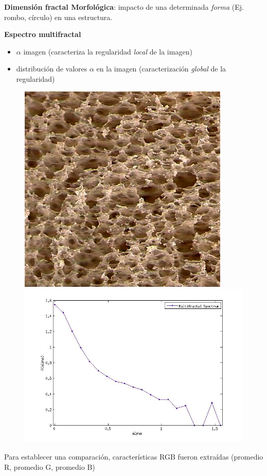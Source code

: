\documentclass{beamer}
\begin{document}
\begin{frame}
\textbf{Dimensi\'on fractal Morfol\'ogica}: impacto de una determinada {\em forma} (Ej. rombo, c\'irculo) en una estructura.

\textbf{Espectro multifractal}
    \begin{itemize}
        \item $\alpha$ imagen (caracteriza la regularidad {\em local} de la imagen)
        \item distribuci\'on de valores $\alpha$ en la imagen (caracterizaci\'on {\em global} de la regularidad)
    \end{itemize}

\begin{figure}
\centering
\includegraphics[scale=1]{../imagenes/lactal31}
\includegraphics[scale = 0.2]{../imagenes/emf}
\end{figure}

Para establecer una comparaci\'on, caracter\'isticas RGB fueron extra\'idas (promedio R, promedio G, promedio B)

\end{frame}
\end{document}
